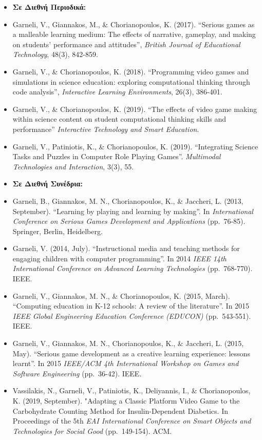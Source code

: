 \documentclass[%
    11pt,
  oneside
  ]{memoir}
\begin{document}
\begin{itemize}
\tightlist
\item
  \textbf{Σε Διεθνή Περιοδικά:}
\item
  Garneli, V., Giannakos, M., \& Chorianopoulos, K. (2017). ``Serious
  games as a malleable learning medium: The effects of narrative,
  gameplay, and making on students' performance and attitudes'',
  \emph{British Journal of Educational Technology}, 48(3), 842-859.
\item
  Garneli, V., \& Chorianopoulos, K. (2018). ``Programming video games
  and simulations in science education: exploring computational thinking
  through code analysis'', \emph{Interactive Learning Environments},
  26(3), 386-401.
\item
  Garneli, V., \& Chorianopoulos, K. (2019). ``The effects of video game
  making within science content on student computational thinking skills
  and performance'' \emph{Interactive Technology and Smart Education}.
\item
  Garneli, V., Patiniotis, K., \& Chorianopoulos, K. (2019).
  ``Integrating Science Tasks and Puzzles in Computer Role Playing
  Games''. \emph{Multimodal Technologies and Interaction}, 3(3), 55.
\item
  \textbf{Σε Διεθνή Συνέδρια:}
\item
  Garneli, B., Giannakos, M. N., Chorianopoulos, K., \& Jaccheri, L.
  (2013, September). ``Learning by playing and learning by making''. In
  \emph{International Conference on Serious Games Development and
  Applications} (pp.~76-85). Springer, Berlin, Heidelberg.
\item
  Garneli, V. (2014, July). ``Instructional media and teaching methods
  for engaging children with computer programming''. In 2014 \emph{IEEE
  14th International Conference on Advanced Learning Technologies}
  (pp.~768-770). IEEE.
\item
  Garneli, V., Giannakos, M. N., \& Chorianopoulos, K. (2015, March).
  ``Computing education in K-12 schools: A review of the literature''.
  In 2015 \emph{IEEE Global Engineering Education Conference (EDUCON)}
  (pp.~543-551). IEEE.\\
\item
  Garneli, V., Giannakos, M. N., Chorianopoulos, K., \& Jaccheri, L.
  (2015, May). ``Serious game development as a creative learning
  experience: lessons learnt''. In 2015 \emph{IEEE/ACM 4th International
  Workshop on Games and Software Engineering} (pp.~36-42). IEEE.
\item
  Vassilakis, N., Garneli, V., Patiniotis, K., Deliyannis, I., \&
  Chorianopoulos, K. (2019, September). "Adapting a Classic Platform
  Video Game to the Carbohydrate Counting Method for Insulin-Dependent
  Diabetics. In Proceedings of the 5th \emph{EAI International
  Conference on Smart Objects and Technologies for Social Good}
  (pp.~149-154). ACM.
\end{itemize}
\end{document}

